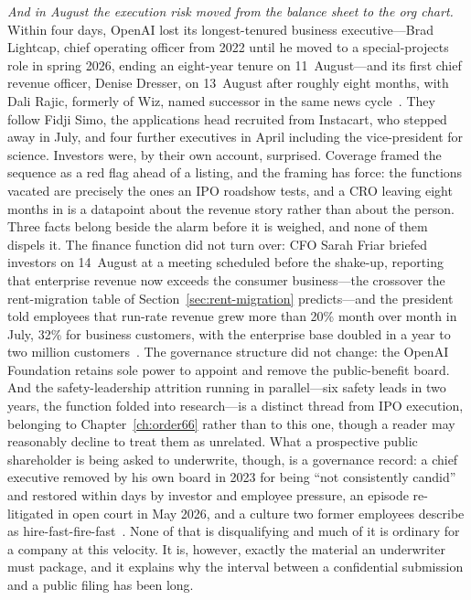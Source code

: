 \emph{And in August the execution risk moved from the balance sheet to the org chart.} Within four days, OpenAI lost its longest-tenured business executive---Brad Lightcap, chief operating officer from 2022 until he moved to a special-projects role in spring 2026, ending an eight-year tenure on 11~August---and its first chief revenue officer, Denise Dresser, on 13~August after roughly eight months, with Dali Rajic, formerly of Wiz, named successor in the same news cycle~\cite{openai-exits}. They follow Fidji Simo, the applications head recruited from Instacart, who stepped away in July, and four further executives in April including the vice-president for science. Investors were, by their own account, surprised. Coverage framed the sequence as a red flag ahead of a listing, and the framing has force: the functions vacated are precisely the ones an IPO roadshow tests, and a CRO leaving eight months in is a datapoint about the revenue story rather than about the person. Three facts belong beside the alarm before it is weighed, and none of them dispels it. The finance function did not turn over: CFO Sarah Friar briefed investors on 14~August at a meeting scheduled before the shake-up, reporting that enterprise revenue now exceeds the consumer business---the crossover the rent-migration table of Section~\ref{sec:rent-migration} predicts---and the president told employees that run-rate revenue grew more than 20\% month over month in July, 32\% for business customers, with the enterprise base doubled in a year to two million customers~\cite{openai-exits}. The governance structure did not change: the OpenAI Foundation retains sole power to appoint and remove the public-benefit board. And the safety-leadership attrition running in parallel---six safety leads in two years, the function folded into research---is a distinct thread from IPO execution, belonging to Chapter~\ref{ch:order66} rather than to this one, though a reader may reasonably decline to treat them as unrelated. What a prospective public shareholder is being asked to underwrite, though, is a governance record: a chief executive removed by his own board in 2023 for being ``not consistently candid'' and restored within days by investor and employee pressure, an episode re-litigated in open court in May 2026, and a culture two former employees describe as hire-fast-fire-fast~\cite{openai-exits}. None of that is disqualifying and much of it is ordinary for a company at this velocity. It is, however, exactly the material an underwriter must package, and it explains why the interval between a confidential submission and a public filing has been long.

